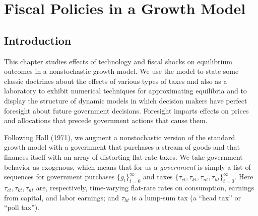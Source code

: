

%




\hbox{}
\def\toone{{t+1}}
\def\ttwo{{t+2}}
\def\tthree{{t+3}}
\def\Tone{{T+1}}
\def\TTT{{T-1}}
\def\rtr{{\rm tr}}

\chapter{Fiscal Policies in a Growth Model\label{linappro}}

\section{Introduction}

This chapter studies  effects of technology and fiscal shocks
on equilibrium outcomes in a nonstochastic growth model. We
use the model to state some classic doctrines about the effects of various types of taxes and also
 as a laboratory to exhibit  numerical
techniques for approximating equilibria and to display the
structure of dynamic models in which decision makers have perfect
foresight about future government decisions.  Foresight imparts   effects on prices and allocations that precede
 government actions that cause them.

Following Hall (1971), we augment a nonstochastic version of the
standard growth model with a government that purchases a stream of
goods and that finances itself with an array of distorting flat-rate
taxes. We take government behavior as exogenous,
which means that for us a {\it government\/} is
 simply a list of sequences for government purchases $\{g_t\}_{t=0}^\infty$
and   taxes $\{\tau_{ct},  \tau_{kt}, \tau_{nt},
\tau_{ht}\}_{t=0}^\infty$. Here $\tau_{ct}, \tau_{kt}, \tau_{nt}$
are, respectively, time-varying flat-rate rates on consumption,
earnings from capital, and labor earnings;  and $\tau_{ht}$ is a lump-sum tax (a ``head
tax'' or ``poll tax'').

